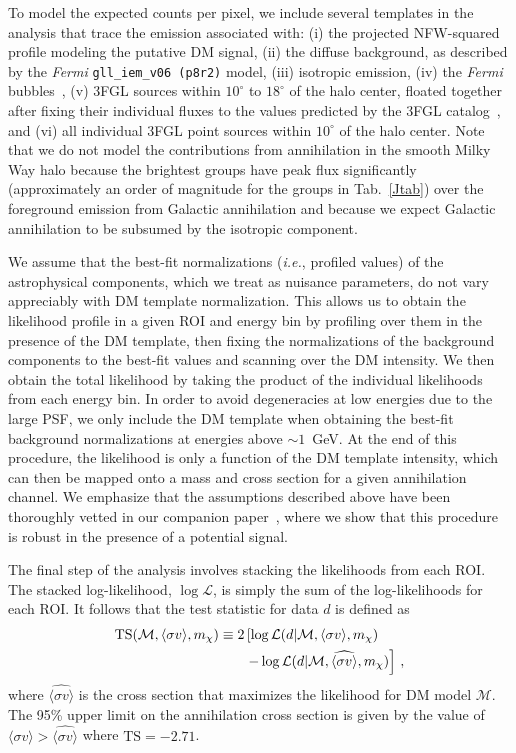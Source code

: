 To model the expected counts per pixel, we include several templates in the analysis that trace the emission associated with: (i) the projected NFW-squared profile modeling the putative DM signal, (ii) the diffuse background, as described by the  {\it Fermi} \texttt{gll\_iem\_v06 (p8r2)} model, (iii) isotropic emission, (iv) the {\it Fermi} bubbles~\cite{Su:2010qj}, (v) 3FGL sources within $10^\circ$ to $18^\circ$ of the halo center, floated together after fixing their individual fluxes to the values predicted by the 3FGL catalog~\cite{Acero:2015hja}, and (vi) all individual 3FGL point sources within $10^{\circ}$ of the halo center.  Note that we do not model the contributions from annihilation in the smooth Milky Way halo because the brightest groups have peak flux significantly (approximately an order of magnitude for the groups in Tab.~\ref{Jtab}) over the foreground emission from Galactic annihilation and because we expect Galactic annihilation to be subsumed by the isotropic component.   

We assume that the best-fit normalizations (\emph{i.e.}, profiled values) of the astrophysical components, which we treat as nuisance parameters, do not vary appreciably with DM template normalization. This allows us to obtain the likelihood profile in a given ROI and energy bin by profiling over them in the presence of the DM template, then fixing the normalizations of the background components to the best-fit values and scanning over the DM intensity. We then obtain the total likelihood by taking the product of the individual likelihoods from each energy bin. In order to avoid degeneracies at low energies due to the large PSF, we only include the DM template when obtaining the best-fit background normalizations at energies above $\sim$$1$~GeV. At the end of this procedure, the likelihood is only a function of the DM template intensity, which can then be mapped onto a mass and cross section for a given annihilation channel. We emphasize that the assumptions described above have been thoroughly vetted in our companion paper~\cite{companion}, where we show that this procedure is robust in the presence of a potential signal.

The final step of the analysis involves stacking the likelihoods from each ROI. The stacked log-likelihood, $\log \mathcal{L}$, is simply the sum of the log-likelihoods for each ROI.  It follows that the test statistic for data $d$ is defined as
 \begin{equation}\begin{aligned}
{\rm TS}(\mathcal{M}, \langle\sigma v\rangle, m_\chi) \equiv 2 &\left[ \log \mathcal{L}(d | \mathcal{M}, \langle\sigma v\rangle, m_\chi ) \right.\\
&\left.- \log \mathcal{L}(d | \mathcal{M}, \widehat{\langle\sigma v\rangle}, m_\chi ) \right]\,,
\label{eq:TSdef}
\end{aligned}\end{equation}
where $\widehat{\langle\sigma v\rangle}$ is the cross section that maximizes the likelihood for DM model $\mathcal{M}$.    The 95\% upper limit on the annihilation cross section is given by the value of $\langle\sigma v\rangle > \widehat{\langle \sigma v\rangle}$ where $\text{TS}=-2.71$.

